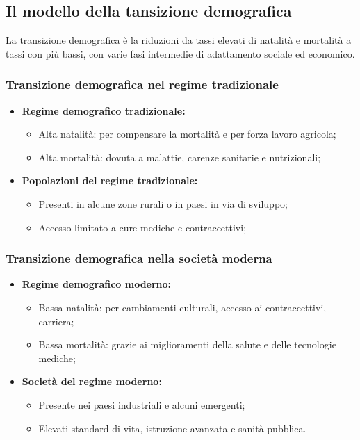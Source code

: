 \documentclass{article}
\begin{document}
\subsection{Il modello della tansizione demografica}
La transizione demografica è la riduzioni da tassi elevati di natalità e mortalità a tassi
con più bassi, con varie fasi intermedie di adattamento sociale ed economico.

\subsubsection{Transizione demografica nel regime tradizionale}
\begin{itemize}
    \item \textbf{Regime demografico tradizionale:}
        \begin{itemize}
            \item Alta natalità: per compensare la mortalità e per forza lavoro agricola;
            \item Alta mortalità: dovuta a malattie, carenze sanitarie e nutrizionali;
        \end{itemize}
    \item \textbf{Popolazioni del regime tradizionale:}
        \begin{itemize}
            \item Presenti in alcune zone rurali o in paesi in via di sviluppo;
            \item Accesso limitato a cure mediche e contraccettivi;
        \end{itemize}
\end{itemize}

\subsubsection{Transizione demografica nella società moderna}
\begin{itemize}
    \item \textbf{Regime demografico moderno:}
        \begin{itemize}
            \item Bassa natalità: per cambiamenti culturali, accesso ai contraccettivi, carriera;
            \item Bassa mortalità: grazie ai miglioramenti della salute e delle tecnologie mediche;
        \end{itemize}
    \item \textbf{Società del regime moderno:}
        \begin{itemize}
            \item Presente nei paesi industriali e alcuni emergenti;
            \item Elevati standard di vita, istruzione avanzata e sanità pubblica.
        \end{itemize}
\end{itemize}
\pagebreak
\end{document}
